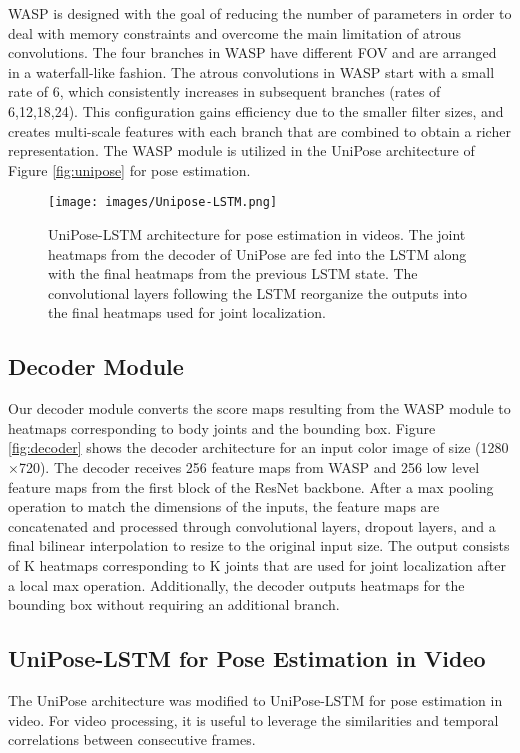 \documentclass[10pt,twocolumn,letterpaper]{article}
\begin{document}
WASP is designed with the goal of reducing the number of parameters in order to deal with memory constraints and overcome the main limitation of atrous convolutions. 
The  four branches in WASP have different FOV and are arranged in a waterfall-like fashion.
The atrous convolutions in WASP start with a small rate of 6, which consistently increases in subsequent branches (rates of 6,12,18,24).  
This configuration gains efficiency due to the smaller filter sizes, and creates multi-scale features with each branch that are combined to obtain a richer representation.
The WASP module is utilized in the UniPose architecture of Figure \ref{fig:unipose} for pose estimation. 

\begin{figure*}[h]
\begin{center}
\texttt{[image: images/Unipose-LSTM.png]}
\end{center}
  \caption{UniPose-LSTM architecture for pose estimation in videos.
  The joint heatmaps from the decoder of UniPose are fed into the LSTM along with the final heatmaps from the previous LSTM state. The convolutional layers following the LSTM reorganize the outputs into the final heatmaps used for joint localization. 
  }
\label{fig:unipose-LSTM}
\end{figure*}


\subsection{Decoder Module}
Our decoder module converts the score maps resulting from the WASP module to heatmaps corresponding to body joints and the bounding box. 
Figure \ref{fig:decoder} shows the decoder architecture for an input color image of size (1280$\times$720).
The decoder receives 256 feature maps from WASP and 256 low level feature maps from the first block of the ResNet backbone. After a max pooling operation to match the dimensions of the inputs, the feature maps are concatenated and processed through convolutional layers, dropout layers, and a final bilinear interpolation to resize to the original input size.
The output consists of K heatmaps corresponding to K joints that are used for joint localization after a local max operation. Additionally, the decoder outputs heatmaps for the bounding box without requiring an additional branch.





\subsection{UniPose-LSTM for Pose Estimation in Video}
The UniPose architecture was modified to UniPose-LSTM for pose estimation in video. 
For video processing, it is useful to leverage the similarities and temporal correlations between consecutive frames.
\end{document}
